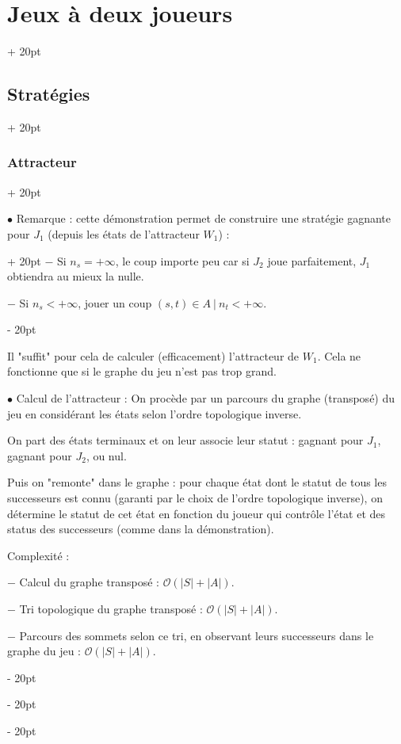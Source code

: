\documentclass[a4paper, 12pt, twoside]{article}
\newcommand{\abs}[1]{\left\lvert #1 \right\rvert}
\newcommand{\ind}[1][20pt]{\advance\leftskip + #1}
\newcommand{\deind}[1][20pt]{\advance\leftskip - #1}
\newenvironment{indt}[2][20pt]{#2 \par \ind[#1]}{\par \deind} %
\begin{document}
\begin{indt}{\section{Jeux à deux joueurs}}
\begin{indt}{\subsection{Stratégies}}
\begin{indt}{\subsubsection{Attracteur}}
                \vspace{12pt}
                
                \begin{indt}{$\bullet$ Remarque : cette démonstration permet de construire une stratégie gagnante pour $J_1$ (depuis les états de l'attracteur $W_1$) :}
                    $-$ Si $n_s = +\infty$, le coup importe peu car si $J_2$ joue parfaitement, $J_1$ obtiendra au mieux la nulle.

                    $-$ Si $n_s < +\infty$, jouer un coup $(s, t) \in A\ |\ n_t < +\infty$.
                \end{indt}

                Il "suffit" pour cela de calculer (efficacement) l'attracteur de $W_1$. Cela ne fonctionne que si le graphe du jeu n'est pas trop grand.

                

                \vspace{12pt}
                
                $\bullet$ Calcul de l'attracteur :
                On procède par un parcours du graphe (transposé) du jeu en considérant les états selon l'ordre topologique inverse.

                On part des états terminaux et on leur associe leur statut : gagnant pour $J_1$, gagnant pour $J_2$, ou nul.

                Puis on "remonte" dans le graphe : pour chaque état dont le statut de tous les successeurs est connu (garanti par le choix de l'ordre topologique inverse), on détermine le statut de cet état en fonction du joueur qui contrôle l'état et des status des successeurs (comme dans la démonstration).

                \vspace{6pt}
                
                Complexité :

                $-$ Calcul du graphe transposé : $\mathcal O(\abs S + \abs A)$.

                $-$ Tri topologique du graphe transposé : $\mathcal O(\abs S + \abs A)$.

                $-$ Parcours des sommets selon ce tri, en observant leurs successeurs dans le graphe du jeu : $\mathcal O(\abs S + \abs A)$.


\end{indt}
\end{indt}
\end{indt}
\end{document}
